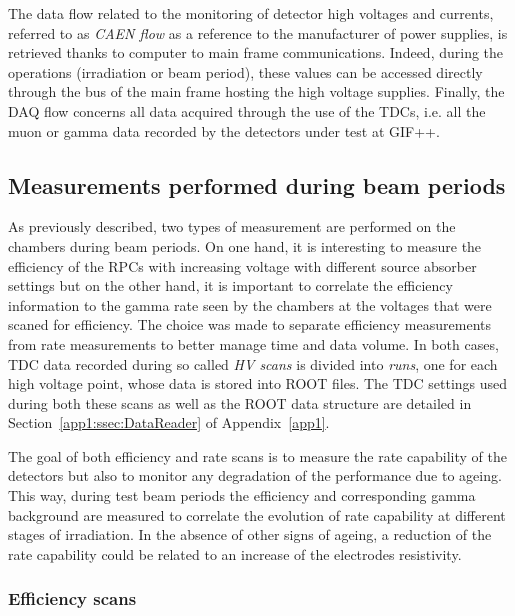 	The data flow related to the monitoring of detector high voltages and currents, referred to as \textit{CAEN flow} as a reference to the manufacturer of power supplies, is retrieved thanks to computer to main frame communications. Indeed, during the operations (irradiation or beam period), these values can be accessed directly through the bus of the main frame hosting the high voltage supplies. Finally, the DAQ flow concerns all data acquired through the use of the TDCs, i.e. all the muon or gamma data recorded by the detectors under test at GIF++.

	\subsection{Measurements performed during beam periods}
	\label{chapt5:ssec:beamperiods}
	
	As previously described, two types of measurement are performed on the chambers during beam periods. On one hand, it is interesting to measure the efficiency of the RPCs with increasing voltage with different source absorber settings but on the other hand, it is important to correlate the efficiency information to the gamma rate seen by the chambers at the voltages that were scaned for efficiency. The choice was made to separate efficiency measurements from rate measurements to better manage time and data volume. In both cases, TDC data recorded during so called \textit{HV scans} is divided into \textit{runs}, one for each high voltage point, whose data is stored into ROOT files. The TDC settings used during both these scans as well as the ROOT data structure are detailed in Section~\ref{app1:ssec:DataReader} of Appendix~\ref{app1}.
	
	The goal of both efficiency and rate scans is to measure the rate capability of the detectors but also to monitor any degradation of the performance due to ageing. This way, during test beam periods the efficiency and corresponding gamma background are measured to correlate the evolution of rate capability at different stages of irradiation. In the absence of other signs of ageing, a reduction of the rate capability could be related to an increase of the electrodes resistivity.
	
		\subsubsection{Efficiency scans}
		\label{chapt5:sssec:effscan}
	
